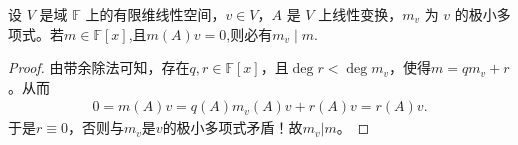 \documentclass[../../main.tex]{subfiles}%
\begin{document}
\begin{proposition}\label{proposition:向量的极小多项式的整性}
设 \( V \) 是域 \( \mathbb{F} \) 上的有限维线性空间，\( v \in V \)，\( A \) 是 \( V \) 上线性变换，\( m_v \) 为 \( v \) 的极小多项式。若$m\in \mathbb{F}[x]$,且$m(A)v=0$,则必有$m_v\mid m.$
\end{proposition}
\begin{proof}

由带余除法可知，存在\( q,r\in \mathbb{F}[x] \)，且\( \deg r<\deg m_v \)，使得\( m=qm_v+r \)。从而
\begin{align*}
0=m(A)v=q(A)m_v(A)v+r(A)v=r(A)v.
\end{align*}
于是\( r\equiv 0 \)，否则与\( m_v \)是\( v \)的极小多项式矛盾！故\( m_v|m \)。

\end{proof}
\end{document}

